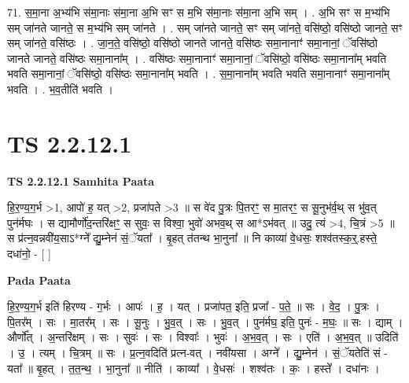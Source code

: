 \documentclass[17pt]{extarticle}
\begin{document}
71. स॒मा॒ना अ॒भ्य॑भि स॑मा॒नाः स॑मा॒ना अ॒भि सꣳ स म॒भि स॑मा॒नाः स॑मा॒ना अ॒भि सम् । . अ॒भि सꣳ स म॒भ्य॑भि सम् जा॑नते जानते॒ स म॒भ्य॑भि सम् जा॑नते । . सम् जा॑नते जानते॒ सꣳ सम् जा॑नते॒ वसि॑ष्ठो॒ वसि॑ष्ठो जानते॒ सꣳ सम् जा॑नते॒ वसि॑ष्ठः । . जा॒न॒ते॒ वसि॑ष्ठो॒ वसि॑ष्ठो जानते जानते॒ वसि॑ष्ठः समा॒नानाꣳ॑ समा॒नानां॒ ॅवसि॑ष्ठो जानते जानते॒ वसि॑ष्ठः समा॒नाना᳚म् । . वसि॑ष्ठः समा॒नानाꣳ॑ समा॒नानां॒ ॅवसि॑ष्ठो॒ वसि॑ष्ठः समा॒नाना᳚म् भवति भवति समा॒नानां॒ ॅवसि॑ष्ठो॒ वसि॑ष्ठः समा॒नाना᳚म् भवति । . स॒मा॒नाना᳚म् भवति भवति समा॒नानाꣳ॑ समा॒नाना᳚म् भवति । . भ॒व॒तीति॑ भवति । \newline
\pagebreak
{}
\section*{ TS 2.2.12.1 }

\textbf{TS 2.2.12.1 } \newline
\textbf{Samhita Paata} \newline

हि॒र॒ण्य॒ग॒र्भ >1, आपो॑ ह॒ यत् >2, प्रजा॑पते >3 ॥ स वे॑द पु॒त्रः पि॒तरꣳ॒॒ स मा॒तरꣳ॒॒ स सू॒नुभ॑र्व॒थ् स भु॑व॒त् पुन॑र्मघः । स द्यामौर्णो॑द॒न्तरि॑क्षꣳ॒॒ स सुवः॒ स विश्वा॒ भुवो॑ अभव॒थ् स आ*ऽभ॑वत् ॥ उदु॒ त्यं >4, चि॒त्रं >5 ॥ स प्र॑त्न॒वन्नवी॑य॒साऽ*ग्ने᳚ द्यु॒म्नेन॑ सं॒ॅयता᳚ । बृ॒हत् त॑तन्थ भा॒नुना᳚ ॥ नि काव्या॑ वे॒धसः॒ शश्व॑तस्क॒र्॒.हस्ते॒ दधा॑नो॒ - [  ] \newline

\textbf{Pada Paata} \newline

हि॒र॒ण्य॒ग॒र्भ इति॑ हिरण्य - ग॒र्भः । आपः॑ । ह॒ । यत् । प्रजा॑पत॒ इति॒ प्रजा᳚ - प॒ते॒ ॥ सः । वे॒द॒ । पु॒त्रः । पि॒तर᳚म् । सः । मा॒तर᳚म् । सः । सू॒नुः । भु॒व॒त् । सः । भु॒व॒त् । पुन॑र्मघ॒ इति॒ पुनः॑ - म॒घः॒ ॥ सः । द्याम् । और्णो᳚त् । अ॒न्तरि॑क्षम् । सः । सुवः॑ । सः । विश्वाः᳚ । भुवः॑ । अ॒भ॒व॒त् । सः । एति॑ । अ॒भ॒व॒त् ॥ उदिति॑ । उ॒ । त्यम् । चि॒त्रम् ॥ सः । प्र॒त्न॒वदिति॑ प्रत्न-वत् । नवी॑यसा । अग्ने᳚ । द्यु॒म्नेन॑ । सं॒ॅयतेति॑ सं - यता᳚ ॥ बृ॒हत् । त॒त॒न्थ॒ । भा॒नुना᳚ ॥ नीति॑ । काव्या᳚ । वे॒धसः॑ । शश्व॑तः । कः॒ । हस्ते᳚ । दधा॑नः ।  \newline
\end{document}
